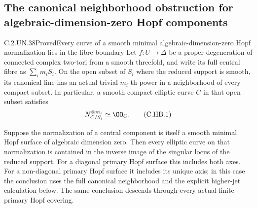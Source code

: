 \subsection{The canonical neighborhood obstruction for algebraic-dimension-zero Hopf components}

\begin{statement}{C.2.UN.38}{Proved}{Every curve of a smooth minimal algebraic-dimension-zero Hopf normalization lies in the fibre boundary}
Let $f:U\to\Delta$ be a proper degeneration of
connected complex two-tori from a smooth threefold,
and write its full central fibre as $\sum_i m_iS_i$.
On the open subset of $S_i$ where the reduced
support is smooth, its canonical line has an
actual trivial $m_i$-th power in a neighborhood
of every compact subset. In particular, a
smooth compact elliptic curve $C$ in that open
subset satisfies
\[
                         N_{C/S_i}^{\otimes m_i}
                                      \simeq\OO_C.    \tag{C.HB.1}
\]

Suppose the normalization of a central component
is itself a smooth minimal Hopf surface of
algebraic dimension zero. Then every elliptic
curve on that normalization is contained in
the inverse image of the singular locus of
the reduced support. For a diagonal primary
Hopf surface this includes both axes. For a
non-diagonal primary Hopf surface it includes
its unique axis; in this case the conclusion
uses the full canonical neighborhood and
the explicit higher-jet calculation below.
The same conclusion descends through every
actual finite primary Hopf covering.
\end{statement}

